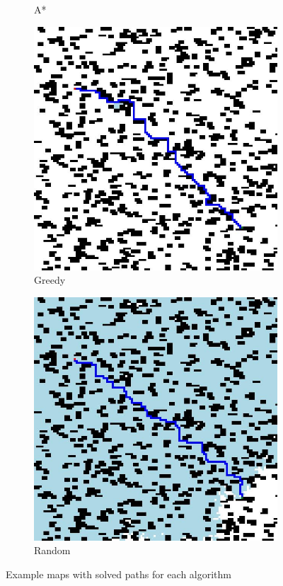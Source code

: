 \documentclass{article}
\begin{document}
\begin{figure}[H]
\begin{subfigure}{0.45\textwidth}
        \caption{A*}
    \end{subfigure}
    \begin{subfigure}{0.45\textwidth}
        \centering
        \includegraphics[width = \textwidth]{images/greedy.jpg}
        \caption{Greedy}
    \end{subfigure}
    \begin{subfigure}{0.45\textwidth}
        \includegraphics[width = \textwidth]{images/random.jpg}
        \caption{Random}
    \end{subfigure}
    \caption{Example maps with solved paths for each algorithm}
    \label{fig:example-maps}
\end{figure}
\end{document}
